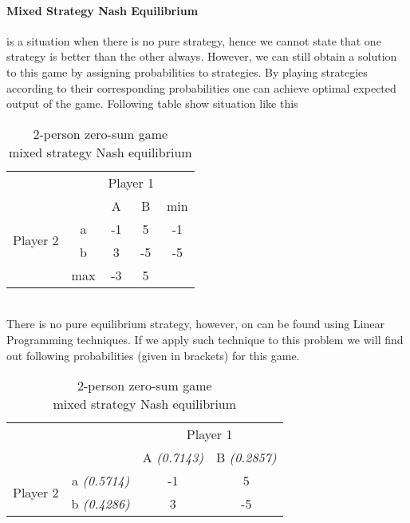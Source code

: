 \documentclass[10pt, a4paper]{report}
\begin{document}
\paragraph{Mixed Strategy Nash Equilibrium} is a situation when there is no pure strategy, hence we cannot state that one strategy is better than the other always. However, we can still obtain a solution to this game by assigning probabilities to strategies. By playing strategies according to their corresponding probabilities one can achieve optimal expected output of the game. Following table show situation like this
\begin{table}[ht!]
	\hspace{-2em}
	\centering
	\begin{tabular}{cccc|c}
		& & \multicolumn{2}{c}{Player 1} &                                \\ \cline{3-4}
		& & A & \multicolumn{1}{c}{B} & min                               \\ \cline{3-4}
		\multirow{2}{*}{Player 2} & \multicolumn{1}{|c|}{a} & -1 & 5 & -1 \\
		& \multicolumn{1}{|c|}{b} & 3 & -5 & -5                           \\ \cline{3-4}
		& max & -3 & \multicolumn{1}{c}{5} &
	\end{tabular}
	\caption{2-person zero-sum game\\mixed strategy Nash equilibrium}
\end{table}
\\
There is no pure equilibrium strategy, however, on can be found using Linear Programming techniques. If we apply such technique to this problem we will find out following probabilities (given in brackets) for this game.
\begin{table}[ht!]
	\hspace{-2em}
	\centering
	\begin{tabular}{cccc|}
		& & \multicolumn{2}{c}{Player 1}                                               \\ \cline{3-4}
		& & A \textit{(0.7143)}& \multicolumn{1}{c}{B \textit{(0.2857)}}               \\ \cline{3-4}
		\multirow{2}{*}{Player 2} & \multicolumn{1}{|c|}{a \textit{(0.5714)}} & -1 & 5 \\
		& \multicolumn{1}{|c|}{b \textit{(0.4286)}} & 3 & -5                           \\ \cline{3-4}
	\end{tabular}
	\caption{2-person zero-sum game\\mixed strategy Nash equilibrium}
\end{table}
\end{document}
